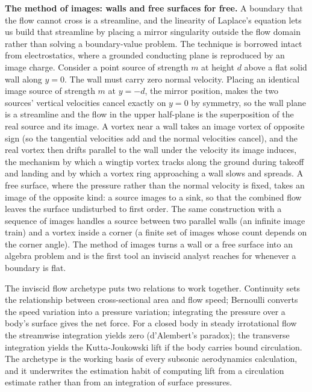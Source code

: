 \begin{mastery}
\textbf{The method of images: walls and free surfaces for free.} A
boundary that the flow cannot cross is a streamline, and the
linearity of Laplace's equation lets us build that streamline by
placing a mirror singularity outside the flow domain rather than
solving a boundary-value problem. The technique is borrowed intact
from electrostatics, where a grounded conducting plane is reproduced
by an image charge. Consider a point source of strength $m$ at height
$d$ above a flat solid wall along $y = 0$. The wall must carry zero
normal velocity. Placing an identical image source of strength $m$ at
$y = -d$, the mirror position, makes the two sources' vertical
velocities cancel exactly on $y = 0$ by symmetry, so the wall plane
is a streamline and the flow in the upper half-plane is the
superposition of the real source and its image. A vortex near a wall
takes an image vortex of opposite sign (so the tangential velocities
add and the normal velocities cancel), and the real vortex then
drifts parallel to the wall under the velocity its image induces, the
mechanism by which a wingtip vortex tracks along the ground during
takeoff and landing and by which a vortex ring approaching a wall
slows and spreads. A free surface, where the pressure rather than the
normal velocity is fixed, takes an image of the opposite kind: a
source images to a sink, so that the combined flow leaves the surface
undisturbed to first order. The same construction with a sequence of
images handles a source between two parallel walls (an infinite
image train) and a vortex inside a corner (a finite set of images
whose count depends on the corner angle). The method of images turns
a wall or a free surface into an algebra problem and is the first
tool an inviscid analyst reaches for whenever a boundary is flat.
\end{mastery}

\begin{archetype}
The inviscid flow archetype puts two relations to work together.
Continuity sets the relationship between cross-sectional area and
flow speed; Bernoulli converts the speed variation into a pressure
variation; integrating the pressure over a body's surface gives the
net force. For a closed body in steady irrotational flow the
streamwise integration yields zero (d'Alembert's paradox); the
transverse integration yields the Kutta-Joukowski lift if the body
carries bound circulation. The archetype is the working basis of
every subsonic aerodynamics calculation, and it underwrites the
estimation habit of computing lift from a circulation estimate
rather than from an integration of surface pressures.
\end{archetype}

